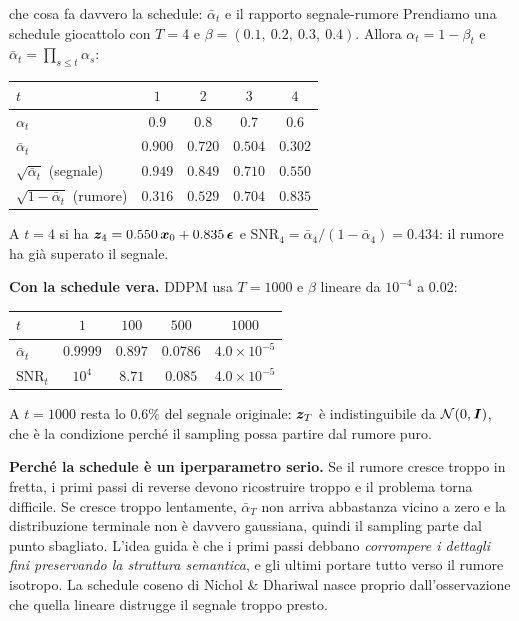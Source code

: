 \begin{esempiosvolto}{che cosa fa davvero la schedule: $\bar\alpha_t$ e il rapporto segnale-rumore}
Prendiamo una schedule giocattolo con $T = 4$ e $\beta = (0.1,\ 0.2,\ 0.3,\ 0.4)$. Allora $\alpha_t = 1 - \beta_t$ e $\bar\alpha_t = \prod_{s \leq t}\alpha_s$:

\begin{center}
\begin{tabular}{lcccc}
\toprule
$t$ & $1$ & $2$ & $3$ & $4$ \\
\midrule
$\alpha_t$ & $0.9$ & $0.8$ & $0.7$ & $0.6$ \\
$\bar\alpha_t$ & $0.900$ & $0.720$ & $0.504$ & $0.302$ \\
$\sqrt{\bar\alpha_t}$ (segnale) & $0.949$ & $0.849$ & $0.710$ & $0.550$ \\
$\sqrt{1-\bar\alpha_t}$ (rumore) & $0.316$ & $0.529$ & $0.704$ & $0.835$ \\
\bottomrule
\end{tabular}
\end{center}

A $t = 4$ si ha $\bm{z}_4 = 0.550\,\bm{x}_0 + 0.835\,\boldsymbol{\epsilon}$ e $\mathrm{SNR}_4 = \bar\alpha_4/(1-\bar\alpha_4) = 0.434$: il rumore ha già superato il segnale.

\medskip
\textbf{Con la schedule vera.} DDPM usa $T = 1000$ e $\beta$ lineare da $10^{-4}$ a $0.02$:

\begin{center}
\begin{tabular}{lcccc}
\toprule
$t$ & $1$ & $100$ & $500$ & $1000$ \\
\midrule
$\bar\alpha_t$ & $0.9999$ & $0.897$ & $0.0786$ & $4.0 \times 10^{-5}$ \\
$\mathrm{SNR}_t$ & $10^{4}$ & $8.71$ & $0.085$ & $4.0 \times 10^{-5}$ \\
\bottomrule
\end{tabular}
\end{center}

A $t = 1000$ resta lo $0.6\%$ del segnale originale: $\bm{z}_T$ è indistinguibile da $\mathcal{N}(0,\bm{I})$, che è la condizione perché il sampling possa partire dal rumore puro.

\medskip
\textbf{Perché la schedule è un iperparametro serio.} Se il rumore cresce troppo in fretta, i primi passi di reverse devono ricostruire troppo e il problema torna difficile. Se cresce troppo lentamente, $\bar\alpha_T$ non arriva abbastanza vicino a zero e la distribuzione terminale non è davvero gaussiana, quindi il sampling parte dal punto sbagliato. L'idea guida è che i primi passi debbano \emph{corrompere i dettagli fini preservando la struttura semantica}, e gli ultimi portare tutto verso il rumore isotropo. La schedule coseno di Nichol \& Dhariwal nasce proprio dall'osservazione che quella lineare distrugge il segnale troppo presto.


\end{esempiosvolto}
